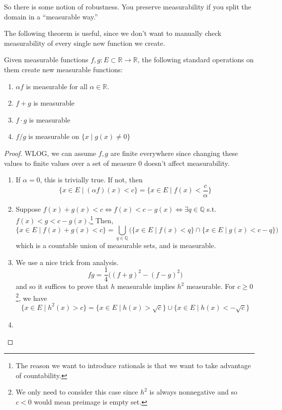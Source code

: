   So there is some notion of robustness. You preserve measurability if you split the domain in a ``measurable way.'' 


  The following theorem is useful, since we don't want to manually check measurability of every single new function we create. 

  \begin{theorem}
    Given measurable functions $f, g: E \subset \mathbb{R} \to \mathbb{R}$, the following standard operations on them create new measurable functions: 
    \begin{enumerate}
      \item $\alpha f$ is measurable for all $\alpha \in \mathbb{R}$. 
      \item $f + g$ is measurable 
      \item $f \cdot g$ is measurable 
      \item $f / g$ is measurable on $\{x \mid g(x) \neq 0\}$ 
    \end{enumerate}
  \end{theorem} 
  \begin{proof}
    WLOG, we can assume $f, g$ are finite everywhere since changing these values to finite values over a set of measure $0$ doesn't affect measurability. 
    \begin{enumerate}
      \item If $\alpha = 0$, this is trivially true. If not, then 
      \begin{equation}
        \{ x \in E \mid (\alpha f) (x) < c \} = \{x \in E \mid f(x) < \frac{c}{\alpha} \} 
      \end{equation}

      \item Suppose $f(x) + g(x) < c \iff f(x) < c - g(x) \iff \exists q \in \mathbb{Q}$ s.t. $f(x) < g < c - g(x)$.\footnote{The reason we want to introduce rationals is that we want to take advantage of countability.} Then, 
      \begin{equation}
        \{x \in E \mid f(x) + g(x) < c \} = \bigcup_{q \in \mathbb{Q}} \big( \{x \in E \mid f(x) < q\} \cap \{x \in E \mid g(x) < c - q \}\big)
      \end{equation}
      which is a countable union of measurable sets, and is measurable. 

      \item We use a nice trick from analysis. 
      \begin{equation}
        fg = \frac{1}{4} \big( (f + g)^2 - (f - g)^2 \big) 
      \end{equation}
      and so it suffices to prove that $h$ measurable implies $h^2$ measurable. For $c \geq 0$\footnote{We only need to consider this case since $h^2$ is always nonnegative and so $c < 0$ would mean preimage is empty set.}, we have 
      \begin{equation}
        \{ x \in E \mid h^2 (x) > c \} = \{x \in E \mid h(x) > \sqrt{c} \} \cup \{x \in E \mid h(x) < -\sqrt{c} \}
      \end{equation}

      \item 
    \end{enumerate}
  \end{proof}

